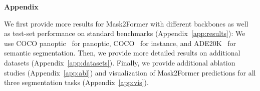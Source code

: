\documentclass[10pt,twocolumn,letterpaper]{article}
\newcommand{\modelname}{Mask2Former\xspace}
\newcommand{\appref}[1]{Appendix~\ref{#1}}
\begin{document}
{\small


}


\clearpage
\appendix
\begin{center}{\bf \Large Appendix}\end{center}\vspace{-2mm}
\renewcommand{\thetable}{\Roman{table}}
\renewcommand{\thefigure}{\Roman{figure}}
\setcounter{table}{0}
\setcounter{figure}{0}
We first provide more results for \modelname with different backbones as well as test-set performance on  standard benchmarks (\appref{app:results}): We use COCO panoptic~\cite{kirillov2017panoptic} for panoptic, COCO~\cite{lin2014coco} for instance, and ADE20K~\cite{zhou2017ade20k} for semantic segmentation. Then, we provide more detailed results on additional datasets (\appref{app:datasets}). Finally, we provide additional ablation studies (\appref{app:abl}) and visualization of \modelname predictions for all three segmentation tasks (\appref{app:vis}).
\end{document}
